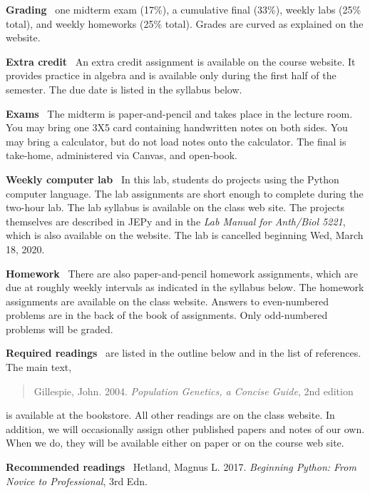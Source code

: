 \documentclass[11pt]{article}
\newcommand{\heading}[1]{\bigskip\noindent\textbf{#1}~}
\begin{document}
\heading{Grading} one midterm exam (17\%), a cumulative final (33\%),
weekly labs (25\% total), and weekly homeworks (25\% total).  Grades are
curved as explained on the website.

\heading{Extra credit} An extra credit assignment is available on the
course website. It provides practice in algebra and is available only
during the first half of the semester. The due date is listed in the
syllabus below.

\heading{Exams} The midterm is paper-and-pencil and takes place in the
lecture room. You may bring one 3X5 card containing handwritten notes
on both sides. You may bring a calculator, but do not load notes onto
the calculator. The final is take-home, administered via Canvas, and
open-book. 

\heading{Weekly computer lab} In this lab, students do projects using
the Python computer language. The lab assignments are short enough to
complete during the two-hour lab. The lab syllabus is available on the
class web site. The projects themselves are described in JEPy and in
the \emph{Lab Manual for Anth/Biol 5221}, which is also available on
the website. The lab is cancelled beginning Wed, March 18, 2020.

\heading{Homework} There are also paper-and-pencil homework
assignments, which are due at roughly weekly intervals as indicated in
the syllabus below. The homework assignments are available on the
class website. Answers to even-numbered problems are in the back of
the book of assignments. Only odd-numbered problems will be graded.

\heading{Required readings} are listed in the outline below and in
the list of references. The main text,
\begin{quote}
Gillespie, John. 2004.
\emph{Population Genetics, a Concise Guide}, 2nd edition
\end{quote}
is available at the bookstore. All other readings are on the class
website. In addition, we will occasionally assign other published
papers and notes of our own.  When we do, they will be available
either on paper or on the course web site.

\heading{Recommended readings} Hetland, Magnus
L. 2017. \emph{Beginning Python: From Novice to Professional}, 3rd
Edn.

\end{document}
